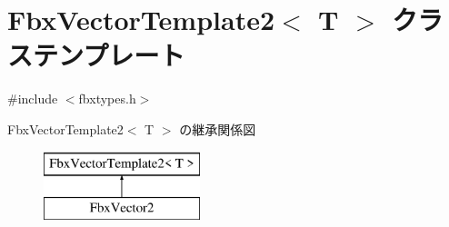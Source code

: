 \hypertarget{class_fbx_vector_template2}{}\section{Fbx\+Vector\+Template2$<$ T $>$ クラステンプレート}
\label{class_fbx_vector_template2}


{\ttfamily \#include $<$fbxtypes.\+h$>$}

Fbx\+Vector\+Template2$<$ T $>$ の継承関係図\begin{figure}[H]
\begin{center}
\leavevmode
\includegraphics[height=2.000000cm]{class_fbx_vector_template2}
\end{center}
\end{figure}
